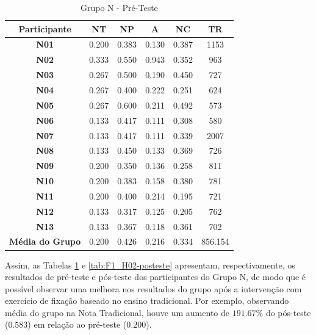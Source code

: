 \begin{table}[htbp]
	\centering
	\caption{Grupo N - Pré-Teste}		
	\begin{tabular}{|c|c|c|c|c|c|}
		\hline
		\rowcolor[HTML]{C0C0C0} 
		\textbf{Participante} & \textbf{NT} & \textbf{NP} & \textbf{A} & \textbf{NC} & \textbf{TR} \\ \hline
		\textbf{N01} & 0.200 & 0.383 & 0.130 & 0.387 & 1153 \\ \hline
		\rowcolor[HTML]{EFEFEF} 
		\textbf{N02} & 0.333 & 0.550 & 0.943 & 0.352 & 963 \\ \hline
		\textbf{N03} & 0.267 & 0.500 & 0.190 & 0.450 & 727 \\ \hline
		\rowcolor[HTML]{EFEFEF} 
		\textbf{N04} & 0.267 & 0.400 & 0.222 & 0.251 & 624 \\ \hline
		\textbf{N05} & 0.267 & 0.600 & 0.211 & 0.492 & 573 \\ \hline
		\rowcolor[HTML]{EFEFEF} 
		\textbf{N06} & 0.133 & 0.417 & 0.111 & 0.308 & 580 \\ \hline
		\textbf{N07} & 0.133 & 0.417 & 0.111 & 0.339 & 2007 \\ \hline
		\rowcolor[HTML]{EFEFEF} 
		\textbf{N08} & 0.133 & 0.450 & 0.133 & 0.369 & 726 \\ \hline
		\textbf{N09} & 0.200 & 0.350 & 0.136 & 0.258 & 811 \\ \hline
		\rowcolor[HTML]{EFEFEF} 
		\textbf{N10} & 0.200 & 0.383 & 0.158 & 0.380 & 781 \\ \hline
		\textbf{N11} & 0.200 & 0.400 & 0.214 & 0.195 & 721 \\ \hline
		\rowcolor[HTML]{EFEFEF} 
		\textbf{N12} & 0.133 & 0.317 & 0.125 & 0.205 & 762 \\ \hline
		\textbf{N13} & 0.133 & 0.367 & 0.118 & 0.361 & 702 \\ \hline
		\rowcolor[HTML]{EFEFEF} 
		\textbf{Média do Grupo} & 0.200 & 0.426 & 0.216 & 0.334 & 856.154 \\ \hline
	\end{tabular}
	\label{tab:F1_H02-preteste}
\end{table}

Assim, as Tabelas \ref{tab:F1_H02-preteste} e \ref{tab:F1_H02-posteste} apresentam, respectivamente, os resultados de pré-teste e pós-teste dos participantes do Grupo N, de modo que é possível observar uma melhora nos resultados do grupo após a intervenção com exercício de fixação baseado no ensino tradicional. Por exemplo, observando média do grupo na Nota Tradicional, houve um aumento de $191.67\%$ do pós-teste ($0.583$) em relação ao pré-teste ($0.200$).

